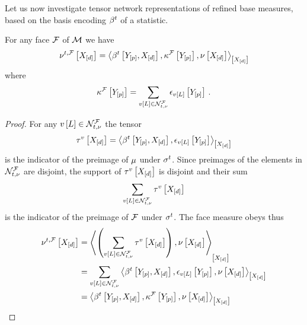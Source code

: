 Let us now investigate tensor network representations of refined base measures, based on the basis encoding $\beta^{t}$ of a statistic.

\begin{theorem}
    \label{the:faceMeasureCharacterization}
    For any face $\mathcal{F}$ of $\mathcal{M}$ we have
    \begin{align*}
        \genfacemeasureat{\shortcatvariables}
        =\contractionof{\sstatccwith,\kcoreofat{\facesymbol}{\headvariables},\basemeasurewith}{\shortcatvariables}
    \end{align*}
    where
    \begin{align*}
        \kappa^{\mathcal{F}}\left[Y_{[p]}\right]
        = \sum_{v\left[L\right]\in\mathcal{N}_{t,\nu}^{\mathcal{F}}} \epsilon_{v\left[L\right]}\left[Y_{[p]}\right] \, .
    \end{align*}
\end{theorem}
\begin{proof}
    For any $v\left[L\right]\in\mathcal{N}_{t,\nu}^{\mathcal{F}}$ the tensor
    \begin{align*}
        \hypercoreofat{\imelement}{\shortcatvariables}
        = \contractionof{\sstatccwith,\onehotmapofat{\imelementwith}{\headvariables}}{\shortcatvariables}
    \end{align*}
    is the indicator of the preimage of $\mu$ under $\sigma^{t}$.
    Since preimages of the elements in $\mathcal{N}_{t,\nu}^{\mathcal{F}}$ are disjoint, the support of $\tau^{v}\left[X_{[d]}\right]$ is disjoint and their sum
    \begin{align*}
        \sum_{v\left[L\right]\in\mathcal{N}_{t,\nu}^{\mathcal{F}}} \tau^{v}\left[X_{[d]}\right]
    \end{align*}
    is the indicator of the preimage of $\mathcal{F}$ under $\sigma^{t}$.
    The face measure obeys thus
    \begin{align*}
        \genfacemeasurewith
        &= \contractionof{\left(
                              \sum_{\imelementwith\in\genfaceimset} \hypercoreofat{\imelement}{\shortcatvariables}
        \right), \basemeasurewith}{\shortcatvariables} \\
        &= \sum_{\imelementwith\in\genfaceimset}
        \contractionof{\sstatccwith,\onehotmapofat{\imelementwith}{\headvariables},\basemeasurewith}{\shortcatvariables} \\
        & = \contractionof{\sstatccwith,\kcoreofat{\facesymbol}{\headvariables},\basemeasurewith}{\shortcatvariables} \qedhere
    \end{align*}
\end{proof}

